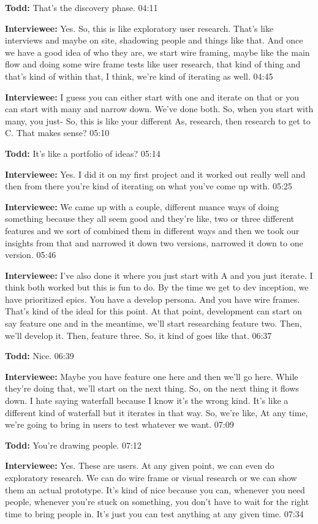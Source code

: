 \textbf{Todd:} 	That's the discovery phase. 04:11

\textbf{Interviewee:} Yes. So, this is like exploratory user research. That's like interviews and maybe on site, shadowing people and things like that. And once we have a good idea of who they are, we start wire framing, maybe like the main flow and doing some wire frame tests like user research, that kind of thing and that's kind of within that, I think, we're kind of iterating as well. 04:45

\textbf{Interviewee:} I guess you can either start with one and iterate on that or you can start with many and narrow down. We've done both. So, when you start with many, you just- So, this is like your different As, research, then research to get to C. That makes sense? 05:10

\textbf{Todd:} It's like a portfolio of ideas? 05:14

\textbf{Interviewee:} Yes. I did it on my first project and it worked out really well and then from there you're kind of iterating on what you've come up with. 05:25

\textbf{Interviewee:} We came up with a couple, different nuance ways of doing something because they all seem good and they're like, two or three different features and we sort of combined them in different ways and then we took our insights from that and narrowed it down two versions, narrowed it down to one version. 05:46

\textbf{Interviewee:} I've also done it where you just start with A and you just iterate. I think both worked but this is fun to do. By the time we get to dev inception, we have prioritized epics. You have a develop persona. And you have wire frames. That's kind of the ideal for this point. At that point, development can start on say feature one and in the meantime, we'll start researching feature two. Then, we'll develop it. Then, feature three. So, it kind of goes like that. 06:37

\textbf{Todd:} Nice. 06:39

\textbf{Interviewee:} Maybe you have feature one here and then we'll go here. While they're doing that, we'll start on the next thing. So, on the next thing it flows down. I hate saying waterfall because I know it's the wrong kind. It's like a different kind of waterfall but it iterates in that way. So, we're like,  At any time, we're going to bring in users to test whatever we want. 07:09

\textbf{Todd:} You're drawing people. 07:12

\textbf{Interviewee:} Yes. These are users. At any given point, we can even do exploratory research. We can do wire frame or visual research or we can show them an actual prototype. 	It's kind of nice because you can, whenever you need people, whenever you're stuck on something, you don't have to wait for the right time to bring people in. 	It's just you can test anything at any given time.  07:34
